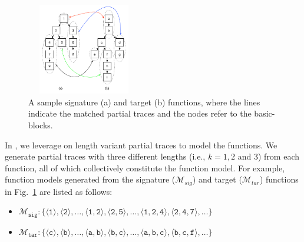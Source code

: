 \begin{figure}[t]
  \centering
  \includegraphics[width = 5cm,height=4cm]{srj-figures/srj-func_mod.pdf} %
  \caption{A sample signature (a) and target (b) functions, where the lines indicate the matched partial traces and the nodes refer to the basic-blocks.} \label{fig:func_mod}
\end{figure}


In \tool, we leverage on length variant partial traces to model the functions. %
We generate partial traces with three different lengths (i.e., $k=1,2$ and $3$) from each function, all of which collectively constitute the function model. For example, function models generated from the signature ($\mathcal{M}_{sig}$) and target ($\mathcal{M}_{tar}$) functions in Fig.~\ref{fig:func_mod} are listed as follows:

\begin{itemize}
\small
\itemsep0em
  \item[] $\mathtt{\mathcal{M}_{sig}:  \lbrace \langle 1 \rangle,  \langle 2 \rangle,\ldots, \langle 1,2 \rangle, \langle 2,5 \rangle, \ldots, \langle 1,2,4 \rangle, \langle 2,4,7 \rangle,\ldots\rbrace}$
   \item[] $\mathtt{\mathcal{M}_{tar}: \lbrace \langle c \rangle,  \langle b \rangle, \ldots, \langle a,b \rangle, \langle b,c \rangle, \ldots, \langle a,b,c \rangle, \langle b,c,f \rangle, \ldots \rbrace}$
\end{itemize}

